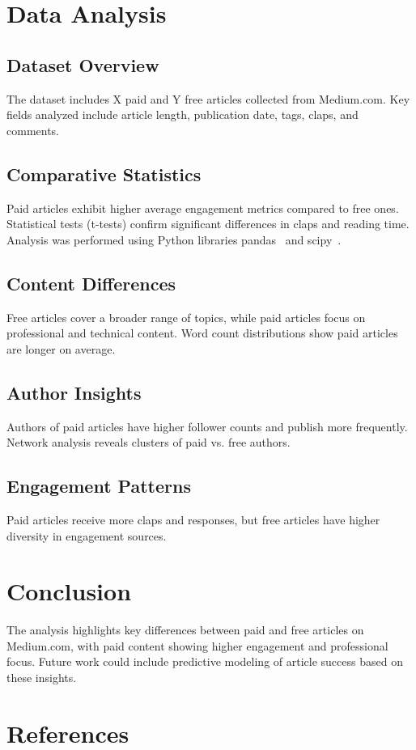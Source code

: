 \documentclass[11pt,a4paper]{article}
\begin{document}
\section{Data Analysis}

\subsection{Dataset Overview}
The dataset includes X paid and Y free articles collected from Medium.com. Key fields analyzed include article length, publication date, tags, claps, and comments.

\subsection{Comparative Statistics}
Paid articles exhibit higher average engagement metrics compared to free ones. Statistical tests (t-tests) confirm significant differences in claps and reading time. Analysis was performed using Python libraries pandas~\cite{pandas} and scipy~\cite{scipy}.

\subsection{Content Differences}
Free articles cover a broader range of topics, while paid articles focus on professional and technical content. Word count distributions show paid articles are longer on average.

\subsection{Author Insights}
Authors of paid articles have higher follower counts and publish more frequently. Network analysis reveals clusters of paid vs. free authors.

\subsection{Engagement Patterns}
Paid articles receive more claps and responses, but free articles have higher diversity in engagement sources.

\section{Conclusion}
The analysis highlights key differences between paid and free articles on Medium.com, with paid content showing higher engagement and professional focus. Future work could include predictive modeling of article success based on these insights.

\section*{References}


\end{document}
